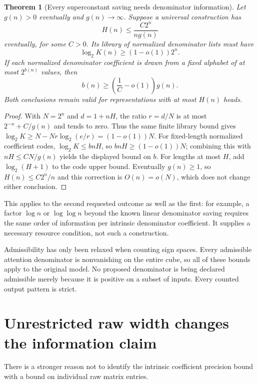 \documentclass[11pt]{article}
\newtheorem{theorem}{Theorem}
\begin{document}
\begin{theorem}[Every superconstant saving needs denominator information]
Let $g(n)>0$ eventually and $g(n)\to\infty$. Suppose a universal
construction has
\[
 H(n)\le \frac{C2^n}{n g(n)}
\]
eventually, for some $C>0$. Its library of normalized denominator
lists must have
\[
 \log_2 K(n)\ge(1-o(1))2^n.
\]
If each normalized denominator coefficient is drawn from a fixed
alphabet of at most $2^{b(n)}$ values, then
\[
 b(n)\ge\left(\frac1C-o(1)\right)g(n).
\]
Both conclusions remain valid for representations with at most
$H(n)$ heads.
\end{theorem}
\begin{proof}
With $N=2^n$ and $d=1+nH$, the ratio $r=d/N$ is at most
$2^{-n}+C/g(n)$ and tends to zero. Thus the same finite library
bound gives
$\log_2 K\ge N-Nr\log_2(e/r)=(1-o(1))N$.
For fixed-length normalized coefficient codes, $\log_2 K\le bnH$,
so
$bnH\ge(1-o(1))N$; combining this with
$nH\le CN/g(n)$ yields the displayed bound on $b$.
For lengths at most $H$, add $\log_2(H+1)$ to the code upper
bound. Eventually $g(n)\ge1$, so $H(n)\le C2^n/n$ and this
correction is $O(n)=o(N)$, which does not change either conclusion.
\end{proof}

This applies to the second requested outcome as well as the first:
for example, a factor $\log n$ or $\log\log n$ beyond the known
linear denominator saving requires the same order of information
per intrinsic denominator coefficient. It supplies a necessary
resource condition, not such a construction.

Admissibility has only been relaxed when counting sign spaces. Every
admissible attention denominator is nonvanishing on the entire cube,
so all of these bounds apply to the original model. No proposed
denominator is being declared admissible merely because it is positive
on a subset of inputs. Every counted output pattern is strict.

\section{Unrestricted raw width changes the information claim}

There is a stronger reason not to identify the intrinsic coefficient
precision bound with a bound on individual raw matrix entries.
\end{document}
